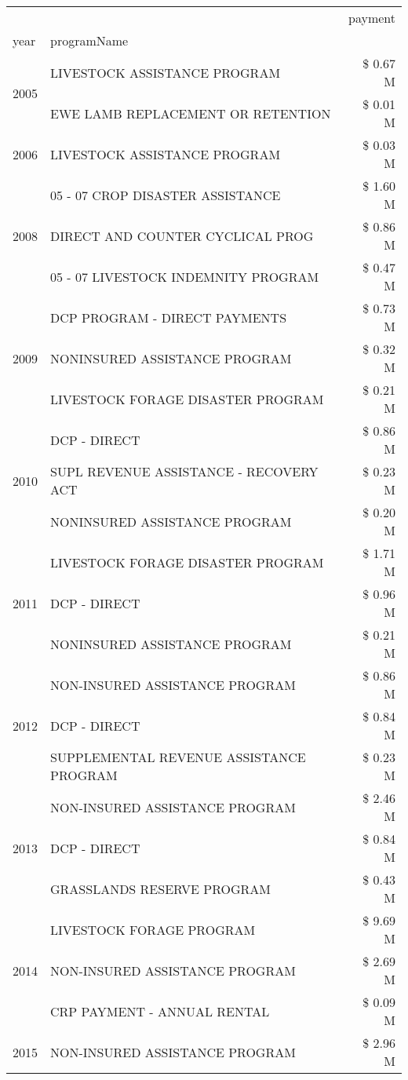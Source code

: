 \begin{tabular}{llr}
\toprule
 &  & payment \\
year & programName &  \\
\midrule
\multirow[t]{2}{*}{2005} & LIVESTOCK ASSISTANCE PROGRAM & \$ 0.67 M \\
 & EWE LAMB REPLACEMENT OR RETENTION & \$ 0.01 M \\
\cline{1-3}
2006 & LIVESTOCK ASSISTANCE PROGRAM & \$ 0.03 M \\
\cline{1-3}
\multirow[t]{3}{*}{2008} & 05 - 07 CROP DISASTER ASSISTANCE & \$ 1.60 M \\
 & DIRECT AND COUNTER CYCLICAL PROG & \$ 0.86 M \\
 & 05 - 07 LIVESTOCK INDEMNITY PROGRAM & \$ 0.47 M \\
\cline{1-3}
\multirow[t]{3}{*}{2009} & DCP PROGRAM - DIRECT PAYMENTS & \$ 0.73 M \\
 & NONINSURED ASSISTANCE PROGRAM & \$ 0.32 M \\
 & LIVESTOCK FORAGE DISASTER  PROGRAM & \$ 0.21 M \\
\cline{1-3}
\multirow[t]{3}{*}{2010} & DCP - DIRECT & \$ 0.86 M \\
 & SUPL REVENUE ASSISTANCE - RECOVERY ACT & \$ 0.23 M \\
 & NONINSURED ASSISTANCE PROGRAM & \$ 0.20 M \\
\cline{1-3}
\multirow[t]{3}{*}{2011} & LIVESTOCK FORAGE DISASTER PROGRAM & \$ 1.71 M \\
 & DCP - DIRECT & \$ 0.96 M \\
 & NONINSURED ASSISTANCE PROGRAM & \$ 0.21 M \\
\cline{1-3}
\multirow[t]{3}{*}{2012} & NON-INSURED ASSISTANCE PROGRAM & \$ 0.86 M \\
 & DCP - DIRECT & \$ 0.84 M \\
 & SUPPLEMENTAL REVENUE ASSISTANCE PROGRAM & \$ 0.23 M \\
\cline{1-3}
\multirow[t]{3}{*}{2013} & NON-INSURED ASSISTANCE PROGRAM & \$ 2.46 M \\
 & DCP - DIRECT & \$ 0.84 M \\
 & GRASSLANDS RESERVE PROGRAM & \$ 0.43 M \\
\cline{1-3}
\multirow[t]{3}{*}{2014} & LIVESTOCK FORAGE PROGRAM & \$ 9.69 M \\
 & NON-INSURED ASSISTANCE PROGRAM & \$ 2.69 M \\
 & CRP PAYMENT - ANNUAL RENTAL & \$ 0.09 M \\
\cline{1-3}
\multirow[t]{3}{*}{2015} & NON-INSURED ASSISTANCE PROGRAM & \$ 2.96 M \\

\end{tabular}
